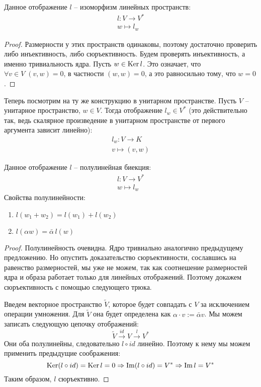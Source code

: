 \begin{theorem-non}
    Данное отображение $l$ -- изоморфизм линейных пространств: \begin{gather*}
        l: V \to  V^* \\
        w \mapsto  l_w
    \end{gather*}
\end{theorem-non}
\begin{proof}
    Размерности у этих пространств одинаковы, поэтому достаточно проверить либо инъективность, либо сюръективность.
    Будем проверять инъективность, а именно тривиальность ядра. Пусть $w \in \operatorname{Ker} l$. Это означает, что $\forall v \in V \; (v, w) = 0$, в частности $(w, w) = 0$, а это равносильно тому, что $w = 0$.
\end{proof}

\vspace*{7mm}

Теперь посмотрим на ту же конструкцию в унитарном пространстве.
Пусть $V$ -- унитарное пространство, $w \in V$. 
Тогда отображение $l_w \in V^*$ (это действительно так, ведь скалярное произведение в унитарном пространстве от первого аргумента зависит линейно): \begin{gather*}
    l_w: V \to K \\
    v \mapsto (v, w)
\end{gather*}
\begin{theorem-non}
    Данное отображение $l$ -- полулинейная биекция: \begin{gather*}
        l: V \to V^* \\
        w \mapsto l_w
    \end{gather*}
    Свойства полулинейности: \begin{enumerate}
        \item $l(w_1 + w_2) = l(w_1) + l(w_2)$
        \item $l(\alpha w) = \bar{\alpha}\, l(w)$
    \end{enumerate}
\end{theorem-non}
\begin{proof}
    Полулинейность очевидна. 
    Ядро тривиально аналогично предыдущему предложению. 
    Но опустить доказательство сюръективности, сославшись на равенство размерностей, мы уже не можем, так как соотнешение размерностей ядра и образа работает только для линейных отображений.
    Поэтому докажем сюръективность с помощью следующего трюка.

    Введем векторное пространство $\tilde{V}$, которое будет совпадать с $V$ за исключением операции умножения.
    Для $\tilde{V}$ она будет определена как $\alpha \cdot v := \bar{\alpha}v$. 
    Мы можем записать следующую цепочку отображений: \[ \tilde{V} \overset{id}{\to} V \overset{l}{\to} V^* \]
    Они оба полулинейны, следовательно $l \circ id$ линейно. 
    Поэтому к нему мы можем применить предыдущие соображения: \[ \operatorname{Ker}(l \circ id) = \operatorname{Ker} l = 0 \Rightarrow \operatorname{Im}(l \circ id) = V^* \Rightarrow \operatorname{Im} l = V^*  \]
    Таким образом, $l$ сюръективно.
\end{proof}

